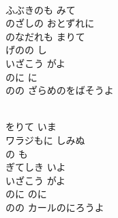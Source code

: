 \documentclass[10pt,b5j]{tarticle} %
\begin{document}
\vspace{1.0em} %
\newcommand{\linespace}{0.3em} %
\newcommand{\blocksize}{0.5\hsize} %
\newcommand{\itemmargin}{3em} %
\begin{enumerate} %
    \setlength{\itemindent}{\itemmargin} %
    \begin{minipage}[c]{\blocksize}
    
        \vspace{\linespace}
        \item~\\
        ふぶきのも みて\\
        のざしの おとずれに\\
        のなだれも まりて\\
        げのの し\\
        いざこう がよ\\
        のに に\\
        のの
        ざらめのをばそうよ
        
        \vspace{\linespace}
        \item~\\
        をりて いま\\
        ワラジもに しみぬ\\
        の も\\
        ぎてしき いよ\\
        いざこう がよ\\
        のに のに\\
        のの
        カールのにろうよ
        
    \end{minipage}
    \begin{minipage}[c]{\blocksize}
        

\end{minipage}
\end{enumerate}
\end{document}
